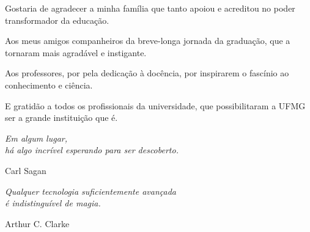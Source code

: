 \begin{agradecimentos}

Gostaria de agradecer a minha família que tanto apoiou e acreditou no poder transformador da educação.

Aos meus amigos companheiros da breve-longa jornada da graduação, que a tornaram mais agradável e instigante.

Aos professores, por pela dedicação à docência, por inspirarem o fascínio ao conhecimento e ciência.

E gratidão a todos os profissionais da universidade, que possibilitaram a UFMG ser a grande instituição que é.



\end{agradecimentos}

\begin{epigrafe}
    \vspace*{\fill}
	\begin{flushright}
		\textit{Em algum lugar, \\ há algo incrível esperando para ser descoberto.}
        
        Carl Sagan

		\textit{Qualquer tecnologia suficientemente avançada \\
		é indistinguível de magia.}
        
        Arthur C. Clarke
	\end{flushright}
\end{epigrafe}
